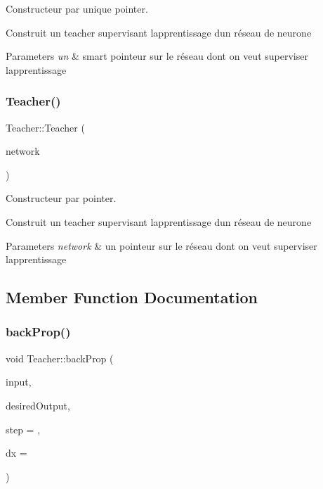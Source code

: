 Constructeur par unique pointer. 

Construit un teacher supervisant l\textquotesingle{}apprentissage d\textquotesingle{}un réseau de neurone 
\begin{DoxyParams}{Parameters}
{\em un} & smart pointeur sur le réseau dont on veut superviser l\textquotesingle{}apprentissage \\
\hline
\end{DoxyParams}
\mbox{\label{classTeacher_afd32ab70242f2c5886d030a5e7d05919}} 
\subsubsection{\texorpdfstring{Teacher()}{Teacher()}\hspace{0.1cm}{\footnotesize\ttfamily [2/2]}}
{\footnotesize\ttfamily Teacher\+::\+Teacher (\begin{DoxyParamCaption}\item[{\hyperlink{classNeuralNetwork}{Neural\+Network} $\ast$}]{network }\end{DoxyParamCaption})}



Constructeur par pointer. 

Construit un teacher supervisant l\textquotesingle{}apprentissage d\textquotesingle{}un réseau de neurone 
\begin{DoxyParams}{Parameters}
{\em network} & un pointeur sur le réseau dont on veut superviser l\textquotesingle{}apprentissage \\
\hline
\end{DoxyParams}


\subsection{Member Function Documentation}
\mbox{\label{classTeacher_a99fc69c5319be890394d2c8503e217c8}} 
\subsubsection{\texorpdfstring{back\+Prop()}{backProp()}}
{\footnotesize\ttfamily void Teacher\+::back\+Prop (\begin{DoxyParamCaption}\item[{Eigen\+::\+Vector\+Xf}]{input,  }\item[{Eigen\+::\+Vector\+Xf}]{desired\+Output,  }\item[{float}]{step = {},  }\item[{float}]{dx = {} }\end{DoxyParamCaption})}



